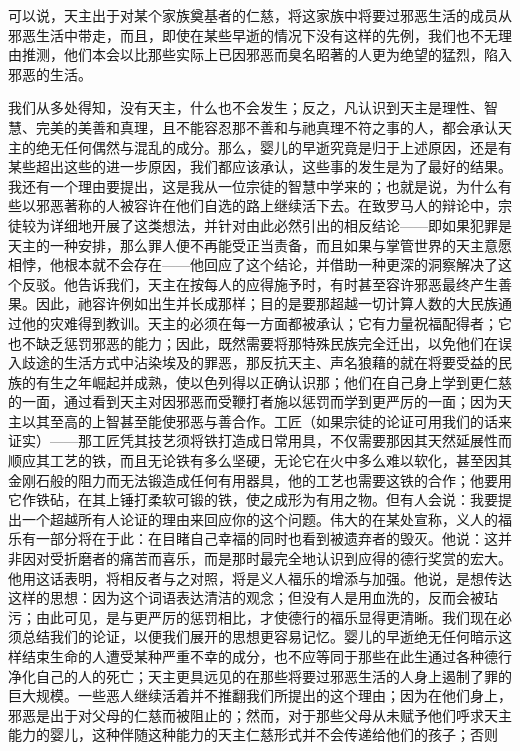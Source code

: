 可以说，天主出于对某个家族奠基者的仁慈，将这家族中将要过邪恶生活的成员从邪恶生活中带走，而且，即使在某些早逝的情况下没有这样的先例，我们也不无理由推测，他们本会以比那些实际上已因邪恶而臭名昭著的人更为绝望的猛烈，陷入邪恶的生活。\par

我们从多处得知，没有天主，什么也不会发生；反之，凡认识到天主是理性、智慧、完美的美善和真理，且不能容忍那不善和与祂真理不符之事的人，都会承认天主的绝无任何偶然与混乱的成分。那么，婴儿的早逝究竟是归于上述原因，还是有某些超出这些的进一步原因，我们都应该承认，这些事的发生是为了最好的结果。我还有一个理由要提出，这是我从一位宗徒的智慧中学来的；也就是说，为什么有些以邪恶著称的人被容许在他们自选的路上继续活下去。在致罗马人的辩论中，宗徒较为详细地开展了这类想法，并针对由此必然引出的相反结论——即如果犯罪是天主的一种安排，那么罪人便不再能受正当责备，而且如果与掌管世界的天主意愿相悖，他根本就不会存在——他回应了这个结论，并借助一种更深的洞察解决了这个反驳。他告诉我们，天主在按每人的应得施予时，有时甚至容许邪恶最终产生善果。因此，祂容许例如出生并长成那样；目的是要那超越一切计算人数的大民族通过他的灾难得到教训。天主的必须在每一方面都被承认；它有力量祝福配得者；它也不缺乏惩罚邪恶的能力；因此，既然需要将那特殊民族完全迁出，以免他们在误入歧途的生活方式中沾染埃及的罪恶，那反抗天主、声名狼藉的就在将要受益的民族的有生之年崛起并成熟，使以色列得以正确认识那；他们在自己身上学到更仁慈的一面，通过看到天主对因邪恶而受鞭打者施以惩罚而学到更严厉的一面；因为天主以其至高的上智甚至能使邪恶与善合作。工匠（如果宗徒的论证可用我们的话来证实）——那工匠凭其技艺须将铁打造成日常用具，不仅需要那因其天然延展性而顺应其工艺的铁，而且无论铁有多么坚硬，无论它在火中多么难以软化，甚至因其金刚石般的阻力而无法锻造成任何有用器具，他的工艺也需要这铁的合作；他要用它作铁砧，在其上锤打柔软可锻的铁，使之成形为有用之物。但有人会说：我要提出一个超越所有人论证的理由来回应你的这个问题。伟大的在某处宣称，义人的福乐有一部分将在于此：在目睹自己幸福的同时也看到被遗弃者的毁灭。他说：这并非因对受折磨者的痛苦而喜乐，而是那时最完全地认识到应得的德行奖赏的宏大。他用这话表明，将相反者与之对照，将是义人福乐的增添与加强。他说，是想传达这样的思想：因为这个词语表达清洁的观念；但没有人是用血洗的，反而会被玷污；由此可见，是与更严厉的惩罚相比，才使德行的福乐显得更清晰。我们现在必须总结我们的论证，以便我们展开的思想更容易记忆。婴儿的早逝绝无任何暗示这样结束生命的人遭受某种严重不幸的成分，也不应等同于那些在此生通过各种德行净化自己的人的死亡；天主更具远见的在那些将要过邪恶生活的人身上遏制了罪的巨大规模。一些恶人继续活着并不推翻我们所提出的这个理由；因为在他们身上，邪恶是出于对父母的仁慈而被阻止的；然而，对于那些父母从未赋予他们呼求天主能力的婴儿，这种伴随这种能力的天主仁慈形式并不会传递给他们的孩子；否则